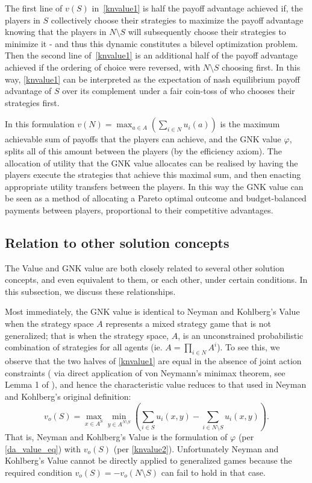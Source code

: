 The first line of $v(S)$ in~\eqref{knvalue1} is half the payoff advantage achieved if, the players in $S$ collectively choose their strategies to maximize the payoff advantage knowing that the players in $N\setminus S$ will subsequently choose their strategies to minimize it - and thus this dynamic constitutes a bilevel optimization problem.
Then the second line of~\eqref{knvalue1} is an additional half of the payoff advantage achieved if the ordering of choice were reversed, with $N\setminus S$ choosing first.
In this way, \eqref{knvalue1} can be interpreted as the expectation of nash equilibrium payoff advantage of $S$ over its complement under a fair coin-toss of who chooses their strategies first.

In this formulation $v(N) = \max_{a\in A} (\sum_{i\in N} u_i(a))$ is the maximum achievable sum of payoffs that the players can achieve, and the GNK value $\varphi$, splits all of this amount between the players (by the efficiency axiom).
The allocation of utility that the GNK value allocates can be realised by having the players execute the strategies that achieve this maximal sum, and then enacting appropriate utility transfers between the players.
In this way the GNK value can be seen as a method of allocating a Pareto optimal outcome and budget-balanced payments between players, proportional to their competitive advantages.

\subsection{Relation to other solution concepts}\label{relating_to_the_old}

The Value and GNK value are both closely related to several other solution concepts, and even equivalent to them, or each other, under certain conditions. In this subsection, we discuss these relationships.

Most immediately, the GNK value is identical to Neyman and Kohlberg's Value \cite{value2} when the strategy space $A$ represents a mixed strategy game that is not generalized; 
 that is when the strategy space, $A$, is an unconstrained probabilistic combination of strategies for all agents (ie. $A = \prod_{i\in N}A^i$).
To see this, we observe that the two halves of \eqref{knvalue1} are equal in the absence of joint action constraints (%
via direct application of von Neymann's minimax theorem, see Lemma 1 of \cite{value2}), 
and hence the characteristic value reduces to that used in Neyman and Kohlberg's original definition:
\begin{equation}\label{knvalue2}v_o(S) = \max_{x\in A^S}\min_{y\in A^{N\setminus S}} \left(\sum_{i\in S} u_i(x,y) - \sum_{i\in N\setminus S} u_i(x,y) \right).\end{equation}
%
That is, Neyman and Kohlberg's Value is the formulation of $\varphi$ (per \eqref{da_value_eq}) 
with $v_o(S)$ (per \eqref{knvalue2}).
Unfortunately Neyman and Kohlberg's Value cannot be directly applied to generalized games because the required condition $v_o(S)=-v_o(N\setminus S)$ can fail to hold in that case. 

